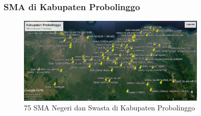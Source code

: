 \begin{frame}
\frametitle{SMA di Kabupaten Probolinggo}
\begin{figure}
\includegraphics[width=0.8\textwidth]{gambar/Peta SMA}
\caption{75 SMA Negeri dan Swasta di Kabupaten Probolinggo}
\end{figure}
\end{frame}